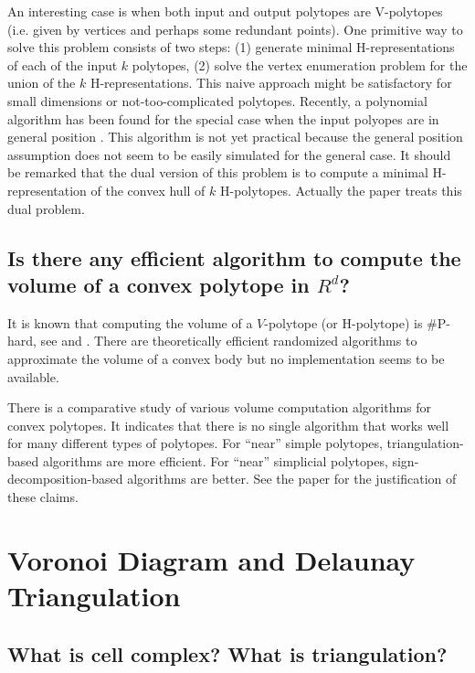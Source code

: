 \documentclass[a4paper,12pt]{article}
\begin{document}
An interesting case is when both input and output polytopes
are V-polytopes (i.e. given by vertices and perhaps some
redundant points).   One primitive way to solve this problem
consists of two steps: (1) generate minimal H-representations
of each of the input $k$ polytopes, (2) solve the vertex
enumeration problem for the union of
the $k$ H-representations.  This naive approach might be
satisfactory for small dimensions or not-too-complicated polytopes.
Recently, a polynomial  algorithm has been found for the special
case when the input polyopes are in general position \cite{fll-ech-00}.
This algorithm is not yet practical because the general
position assumption does not seem to be easily simulated 
for the general case.  It should be remarked that the dual
version of this problem is to compute a minimal H-representation
of the convex hull of $k$ H-polytopes.  Actually the paper \cite{fll-ech-00}
treats this dual problem.

\subsection{Is there any efficient algorithm to compute
the volume of a convex polytope in $R^d$?}
\label{polytope:volume}

It is known that computing the volume of a $V$-polytope
(or H-polytope) is \#P-hard, see \cite{df-tccvp-88}
and \cite{k-cpvc-93}.   There are theoretically efficient randomized algorithms
to approximate the volume of a convex body \cite{ls-rwcbi-93}
but no implementation seems to be available.

There is a comparative study \cite{bef-cevcm-00} of various 
volume computation algorithms
for convex polytopes.  It indicates that there is no single
algorithm that works well for many different types of polytopes.
For ``near'' simple polytopes, triangulation-based algorithms are
more efficient. For ``near'' simplicial polytopes, sign-decomposition-based
algorithms are better.   See the paper for the justification of
these claims.


\section{Voronoi Diagram and Delaunay Triangulation} \label{Sec:voronoi}

\subsection{What is cell complex?  What is triangulation?}
\label{voronoi:complex}
\end{document}
